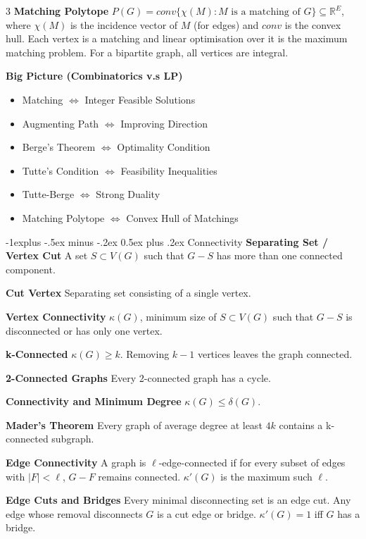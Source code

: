 \documentclass[10pt, landscape]{article}
\makeatletter
\renewcommand{\section}{\@startsection{section}{1}{0mm}%
                                {-1ex plus -.5ex minus -.2ex}%
                                {0.5ex plus .2ex}%
                                {\normalfont\large\bfseries}}
\renewcommand{\section}{\@startsection{section}{2}{0mm}%
                                {-1explus -.5ex minus -.2ex}%
                                {0.5ex plus .2ex}%
                                {\normalfont\normalsize\bfseries}}
\makeatother
\begin{document}
\begin{multicols*}{3}
\textbf{Matching Polytope} $P(G)=conv\{\chi(M) : \text{$M$ is a matching of $G$}\} \subseteq \mathbb{R}^E$, where $\chi(M)$ is the incidence vector of $M$ (for edges) and $conv$ is the convex hull. Each vertex is a matching and linear optimisation over it is the maximum matching problem. For a bipartite graph, all vertices are integral.

\textbf{Big Picture (Combinatorics v.s LP)}
\begin{itemize}
    \item Matching $\Leftrightarrow$ Integer Feasible Solutions
    \item Augmenting Path $\Leftrightarrow$ Improving Direction
    \item Berge's Theorem $\Leftrightarrow$ Optimality Condition
    \item Tutte's Condition $\Leftrightarrow$ Feasibility Inequalities
    \item Tutte-Berge $\Leftrightarrow$ Strong Duality
    \item Matching Polytope $\Leftrightarrow$ Convex Hull of Matchings
\end{itemize}

\section{Connectivity}
\textbf{Separating Set / Vertex Cut} A set $S \subset V(G)$ such that $G-S$ has more than one connected component.

\textbf{Cut Vertex} Separating set consisting of a single vertex.

\textbf{Vertex Connectivity} $\kappa(G)$, minimum size of $S \subset V(G)$ such that $G-S$ is disconnected or has only one vertex.

\textbf{k-Connected} $\kappa(G) \geq k$. Removing $k-1$ vertices leaves the graph connected.

\textbf{2-Connected Graphs} Every 2-connected graph has a cycle.

\textbf{Connectivity and Minimum Degree} $\kappa(G) \leq \delta(G)$.

\textbf{Mader's Theorem} Every graph of average degree at least $4k$ contains a k-connected subgraph.

\textbf{Edge Connectivity} A graph is $\ell$-edge-connected if for every subset of edges with $|F| < \ell$, $G-F$ remains connected. $\kappa'(G)$ is the maximum such $\ell$.

\textbf{Edge Cuts and Bridges} Every minimal disconnecting set is an edge cut. Any edge whose removal disconnects $G$ is a cut edge or bridge. $\kappa'(G)=1$ iff $G$ has a bridge.


\end{multicols*}
\end{document}
